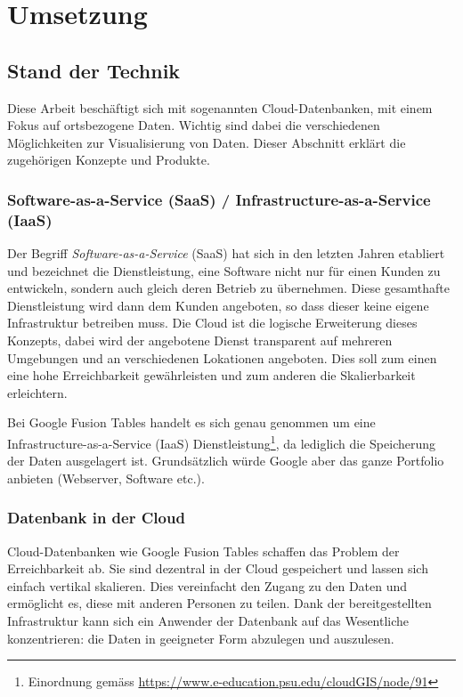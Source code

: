 \chapter{Umsetzung}
\label{umsetzung}

\section{Stand der Technik}
Diese Arbeit beschäftigt sich mit sogenannten \gls{Cloud}-Datenbanken, mit einem Fokus auf ortsbezogene Daten. Wichtig sind dabei die verschiedenen Möglichkeiten zur Visualisierung von Daten. Dieser Abschnitt erklärt die zugehörigen Konzepte und Produkte.

\subsection{Software-as-a-Service (SaaS) / Infrastructure-as-a-Service (IaaS)}
Der Begriff \emph{Software-as-a-Service} (\gls{SaaS}) hat sich in den letzten Jahren etabliert und bezeichnet die Dienstleistung, eine Software nicht nur für einen Kunden zu entwickeln, sondern auch gleich deren Betrieb zu übernehmen. Diese gesamthafte Dienstleistung wird dann dem Kunden angeboten, so dass dieser keine eigene Infrastruktur betreiben muss. Die \gls{Cloud} ist die logische  Erweiterung dieses Konzepts, dabei wird der angebotene Dienst transparent auf mehreren Umgebungen und an verschiedenen Lokationen angeboten. Dies soll zum einen eine hohe Erreichbarkeit gewährleisten und zum anderen die Skalierbarkeit erleichtern.\cite{cloud}

Bei Google Fusion Tables handelt es sich genau genommen um eine Infrastructure-as-a-Service (IaaS) Dienstleistung\footnote{Einordnung gemäss \url{https://www.e-education.psu.edu/cloudGIS/node/91}}, da lediglich die Speicherung der Daten ausgelagert ist. Grundsätzlich würde Google aber das ganze Portfolio anbieten (Webserver,  Software etc.).

\subsection{Datenbank in der Cloud}
\gls{Cloud}-Datenbanken wie Google Fusion Tables schaffen das Problem der Erreichbarkeit ab. Sie sind dezentral in der \gls{Cloud} gespeichert und lassen sich  einfach vertikal skalieren. Dies vereinfacht den Zugang zu den Daten und ermöglicht es, diese mit anderen Personen zu teilen. Dank der bereitgestellten Infrastruktur kann sich ein Anwender der Datenbank auf das Wesentliche konzentrieren: die Daten in geeigneter Form abzulegen und auszulesen.

